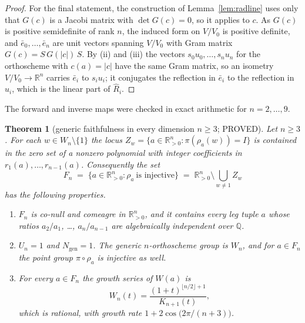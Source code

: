 \documentclass[11pt]{article}
\newtheorem{theorem}{Theorem}[section]
\theoremstyle{definition}
\theoremstyle{remark}
\theoremstyle{definition}
\newcommand{\Q}{\mathbb{Q}}
\newcommand{\R}{\mathbb{R}}
\begin{document}
\begin{proof}
For the final statement, the construction of Lemma~\ref{lem:radline} uses only that $G(c)$ is a
Jacobi matrix with $\det G(c)=0$, so it applies to $c$. As $G(c)$ is positive semidefinite of rank
$n$, the induced form on $V/V_0$ is positive definite, and $\bar e_0,\dots,\bar e_n$ are unit
vectors spanning $V/V_0$ with Gram matrix $G(c)=S\,G(|c|)\,S$. By (ii) and (iii) the vectors
$s_0u_0,\dots,s_nu_n$ for the orthoscheme with $c(a)=|c|$ have the same Gram matrix, so an isometry
$V/V_0\to\R^n$ carries $\bar e_i$ to $s_iu_i$; it conjugates the reflection in $\bar e_i$ to the
reflection in $u_i$, which is the linear part of $\widehat R_i$.
\end{proof}

The forward and inverse maps were checked in exact arithmetic for $n=2,\dots,9$.

\begin{theorem}[generic faithfulness in every dimension $n\ge3$; PROVED]\label{thm:generic}
Let $n\ge3$. For each $w\in W_n\setminus\{1\}$ the locus
$Z_w=\{a\in\R_{>0}^n:\pi(\rho_a(w))=I\}$ is contained in the zero set of a nonzero polynomial with
integer coefficients in $r_1(a),\dots,r_{n-1}(a)$. Consequently the set
\[
   F_n\;=\;\{a\in\R_{>0}^n:\rho_a\ \text{is injective}\}\;=\;\R_{>0}^n\setminus\bigcup_{w\ne1}Z_w
\]
has the following properties.
\begin{enumerate}[label=\textup{(\roman*)},leftmargin=2.4em]
\item $F_n$ is co-null and comeagre in $\R_{>0}^n$, and it contains every leg tuple $a$ whose
ratios $a_2/a_1$, \dots, $a_n/a_{n-1}$ are algebraically independent over $\Q$.
\item $U_n=1$ and $N_{\mathrm{gen}}=1$. The generic $n$-orthoscheme group is $W_n$, and for
$a\in F_n$ the point group $\pi\circ\rho_a$ is injective as well.
\item For every $a\in F_n$ the growth series of $W(a)$ is
\[
  W_n(t)=\frac{(1+t)^{\lfloor n/2\rfloor+1}}{K_{n+1}(t)},
\]
which is rational, with growth rate $1+2\cos\bigl(2\pi/(n+3)\bigr)$.
\end{enumerate}
\end{theorem}
\end{document}
